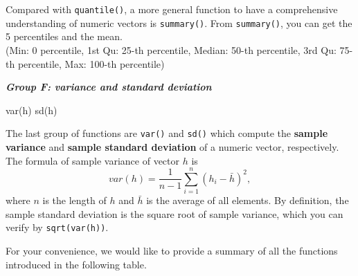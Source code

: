 \documentclass[
]{book}
\newenvironment{Shaded}{\begin{snugshade}}{\end{snugshade}}
\newcommand{\FunctionTok}[1]{\textcolor[rgb]{0.00,0.00,0.00}{#1}}
\newcommand{\NormalTok}[1]{#1}
\begin{document}
Compared with \texttt{quantile()}, a more general function to have a comprehensive understanding of numeric vectors is \texttt{summary()}. From \texttt{summary()}, you can get the 5 percentiles and the mean.\\
(Min: 0 percentile, 1st Qu: 25-th percentile, Median: 50-th percentile, 3rd Qu: 75-th percentile, Max: 100-th percentile)

\textbf{\emph{Group F: variance and standard deviation}}

\begin{Shaded}
\begin{Highlighting}[]
\FunctionTok{var}\NormalTok{(h)}
\FunctionTok{sd}\NormalTok{(h)}
\end{Highlighting}
\end{Shaded}

The last group of functions are \texttt{var()} and \texttt{sd()} which compute the \textbf{sample variance} and \textbf{sample standard deviation} of a numeric vector, respectively. The formula of sample variance of vector \(h\) is \[var(h) = \frac{1}{n-1}\sum_{i=1}^n (h_i-\bar h)^2,\] where \(n\) is the length of \(h\) and \(\bar h\) is the average of all elements. By definition, the sample standard deviation is the square root of sample variance, which you can verify by \texttt{sqrt(var(h))}.

For your convenience, we would like to provide a summary of all the functions introduced in the following table.
\end{document}
